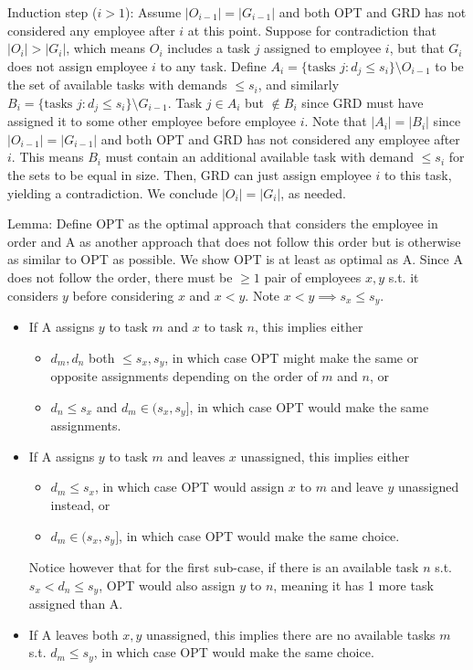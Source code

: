 \documentclass[11pt]{article}
\begin{document}
Induction step ($i>1$): Assume $|O_{i-1}|=|G_{i-1}|$ and both OPT and GRD has not considered any employee after $i$ at this point. Suppose for contradiction that $|O_i|>|G_i|$, which means $O_i$ includes a task $j$ assigned to employee $i$, but that $G_i$ does not assign employee $i$ to any task. Define $A_i=\{\text{tasks } j: d_j\leq s_{i}\}\setminus O_{i-1}$ to be the set of available tasks with demands $\leq s_i$, and similarly $B_i=\{\text{tasks } j: d_j\leq s_{i}\}\setminus G_{i-1}$. Task $j\in A_i$ but $\notin B_i$ since GRD must have assigned it to some other employee before employee $i$. Note that $|A_i|=|B_i|$ since $|O_{i-1}|=|G_{i-1}|$ and both OPT and GRD has not considered any employee after $i$. This means $B_i$ must contain an additional available task with demand $\leq s_i$ for the sets to be equal in size. Then, GRD can just assign employee $i$ to this task, yielding a contradiction. We conclude $|O_i|=|G_i|$, as needed.

Lemma: Define OPT as the optimal approach that considers the employee in order and A as another approach that does not follow this order but is otherwise as similar to OPT as possible. We show OPT is at least as optimal as A. Since A does not follow the order, there must be $\geq 1$ pair of employees $x,y$ s.t. it considers $y$ before considering $x$ and $x<y$. Note $x<y\implies s_x\leq s_y$.

\begin{itemize}
    \item If A assigns $y$ to task $m$ and $x$ to task $n$, this implies either
    \begin{itemize}
        \item $d_m,d_n$ both $\leq s_x,s_y$, in which case OPT might make the same or opposite assignments depending on the order of $m$ and $n$, or
        \item $d_n\leq s_x$ and $d_m \in (s_x,s_y]$, in which case OPT would make the same assignments.
    \end{itemize}
    \item If A assigns $y$ to task $m$ and leaves $x$ unassigned, this implies either
    \begin{itemize}
        \item $d_m\leq s_x$, in which case OPT would assign $x$ to $m$ and leave $y$ unassigned instead, or
        \item $d_m\in (s_x,s_y]$, in which case OPT would make the same choice.
    \end{itemize}Notice however that for the first sub-case, if there is an available task $n$ s.t. $s_x < d_n \leq s_y$, OPT would also assign $y$ to $n$, meaning it has 1 more task assigned than A.
    \item If A leaves both $x,y$ unassigned, this implies there are no available tasks $m$ s.t. $d_m\leq s_y$, in which case OPT would make the same choice.
\end{itemize}
\end{document}
